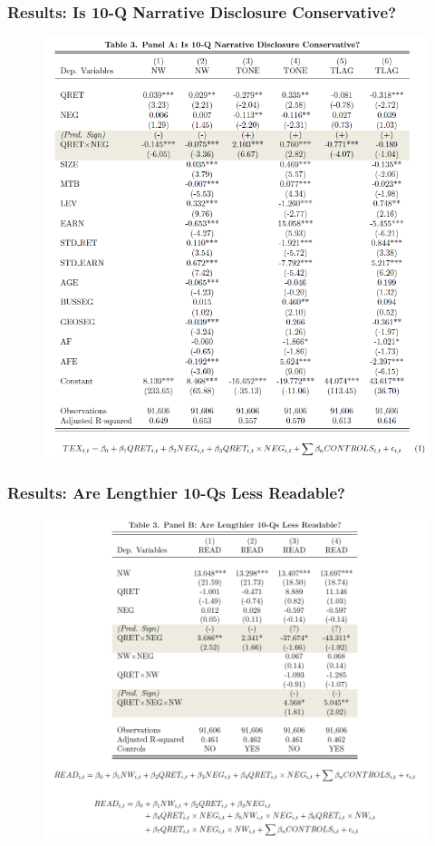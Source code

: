 \documentclass{beamer}
\begin{document}
\begin{frame}
\frametitle{Results: Is 10-Q Narrative Disclosure Conservative?}
	\begin{figure}[h]
		\centering
		\includegraphics[width=0.55\linewidth]{tab3panA}
		\label{tab3panA}
	\end{figure}
\end{frame}
\begin{frame}
\frametitle{Results: Are Lengthier 10-Qs Less Readable?}
	\begin{figure}[h]
	\centering
	\includegraphics[width=0.75\linewidth]{tab3panB}
	\label{tab3panB}
	\end{figure}
\end{frame}
\end{document}
